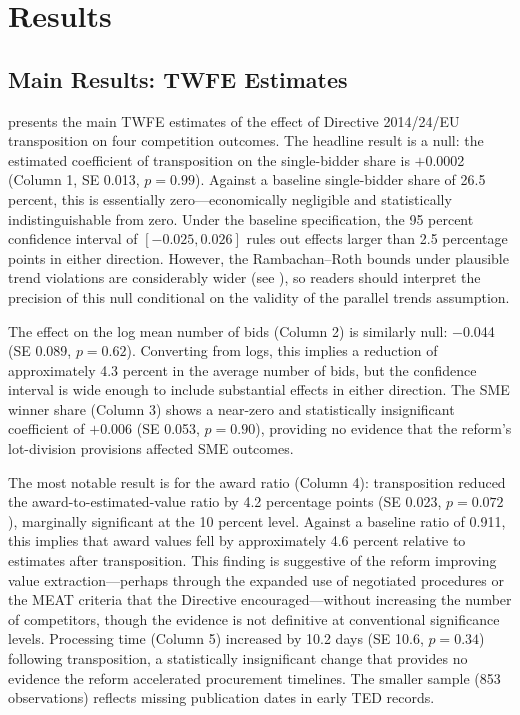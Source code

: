 \documentclass[12pt]{article}
\begin{document}
\section{Results}
\label{sec:results}

\subsection{Main Results: TWFE Estimates}

 presents the main TWFE estimates of the effect of Directive 2014/24/EU transposition on four competition outcomes. The headline result is a null: the estimated coefficient of transposition on the single-bidder share is $+$0.0002 (Column 1, SE 0.013, $p = 0.99$). Against a baseline single-bidder share of 26.5 percent, this is essentially zero---economically negligible and statistically indistinguishable from zero. Under the baseline specification, the 95 percent confidence interval of $[-0.025, 0.026]$ rules out effects larger than 2.5 percentage points in either direction. However, the Rambachan--Roth bounds under plausible trend violations are considerably wider (see ), so readers should interpret the precision of this null conditional on the validity of the parallel trends assumption.



The effect on the log mean number of bids (Column 2) is similarly null: $-$0.044 (SE 0.089, $p = 0.62$). Converting from logs, this implies a reduction of approximately 4.3 percent in the average number of bids, but the confidence interval is wide enough to include substantial effects in either direction. The SME winner share (Column 3) shows a near-zero and statistically insignificant coefficient of $+$0.006 (SE 0.053, $p = 0.90$), providing no evidence that the reform's lot-division provisions affected SME outcomes.

The most notable result is for the award ratio (Column 4): transposition reduced the award-to-estimated-value ratio by 4.2 percentage points (SE 0.023, $p = 0.072$), marginally significant at the 10 percent level. Against a baseline ratio of 0.911, this implies that award values fell by approximately 4.6 percent relative to estimates after transposition. This finding is suggestive of the reform improving value extraction---perhaps through the expanded use of negotiated procedures or the MEAT criteria that the Directive encouraged---without increasing the number of competitors, though the evidence is not definitive at conventional significance levels. Processing time (Column 5) increased by 10.2 days (SE 10.6, $p = 0.34$) following transposition, a statistically insignificant change that provides no evidence the reform accelerated procurement timelines. The smaller sample (853 observations) reflects missing publication dates in early TED records.
\end{document}
